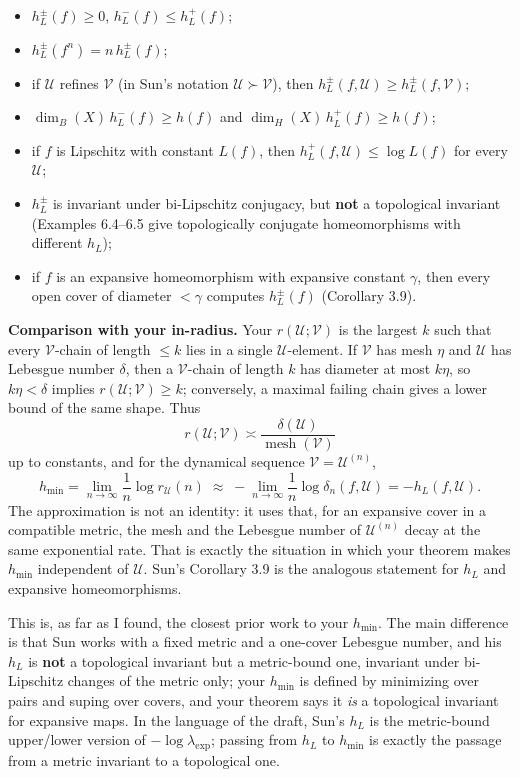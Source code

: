 \documentclass[
]{article}
\providecommand{\tightlist}{%
  \setlength{\itemsep}{0pt}\setlength{\parskip}{0pt}}
\begin{document}
\begin{itemize}
\tightlist
\item
  \(h_L^\pm(f)\ge0\), \(h_L^-(f)\le h_L^+(f)\);
\item
  \(h_L^\pm(f^n)=n\,h_L^\pm(f)\);
\item
  if \(\mathcal U\) refines \(\mathcal V\) (in Sun's notation
  \(\mathcal U\succ\mathcal V\)), then
  \(h_L^\pm(f,\mathcal U)\ge h_L^\pm(f,\mathcal V)\);
\item
  \(\dim_B(X)\,h_L^-(f)\ge h(f)\) and \(\dim_H(X)\,h_L^+(f)\ge h(f)\);
\item
  if \(f\) is Lipschitz with constant \(L(f)\), then
  \(h_L^+(f,\mathcal U)\le\log L(f)\) for every \(\mathcal U\);
\item
  \(h_L^\pm\) is invariant under bi-Lipschitz conjugacy, but
  \textbf{not} a topological invariant (Examples 6.4--6.5 give
  topologically conjugate homeomorphisms with different \(h_L\));
\item
  if \(f\) is an expansive homeomorphism with expansive constant
  \(\gamma\), then every open cover of diameter \(<\gamma\) computes
  \(h_L^\pm(f)\) (Corollary 3.9).
\end{itemize}

\textbf{Comparison with your in-radius.} Your
\(r(\mathcal U;\mathcal V)\) is the largest \(k\) such that every
\(\mathcal V\)-chain of length \(\le k\) lies in a single
\(\mathcal U\)-element. If \(\mathcal V\) has mesh \(\eta\) and
\(\mathcal U\) has Lebesgue number \(\delta\), then a
\(\mathcal V\)-chain of length \(k\) has diameter at most \(k\eta\), so
\(k\eta<\delta\) implies \(r(\mathcal U;\mathcal V)\ge k\); conversely,
a maximal failing chain gives a lower bound of the same shape. Thus \[
r(\mathcal U;\mathcal V)\asymp \frac{\delta(\mathcal U)}{\operatorname{mesh}(\mathcal V)}
\] up to constants, and for the dynamical sequence
\(\mathcal V=\mathcal U^{(n)}\), \[
h_{\min}=\lim_{n\to\infty}\frac1n\log r_{\mathcal U}(n)
\;\approx\;-\lim_{n\to\infty}\frac1n\log\delta_n(f,\mathcal U)
=-h_L(f,\mathcal U).
\] The approximation is not an identity: it uses that, for an expansive
cover in a compatible metric, the mesh and the Lebesgue number of
\(\mathcal U^{(n)}\) decay at the same exponential rate. That is exactly
the situation in which your theorem makes \(h_{\min}\) independent of
\(\mathcal U\). Sun's Corollary 3.9 is the analogous statement for
\(h_L\) and expansive homeomorphisms.

This is, as far as I found, the closest prior work to your \(h_{\min}\).
The main difference is that Sun works with a fixed metric and a
one-cover Lebesgue number, and his \(h_L\) is \textbf{not} a topological
invariant but a metric-bound one, invariant under bi-Lipschitz changes
of the metric only; your \(h_{\min}\) is defined by minimizing over
pairs and suping over covers, and your theorem says it \emph{is} a
topological invariant for expansive maps. In the language of the draft,
Sun's \(h_L\) is the metric-bound upper/lower version of
\(-\log\lambda_{\exp}\); passing from \(h_L\) to \(h_{\min}\) is exactly
the passage from a metric invariant to a topological one.
\end{document}
